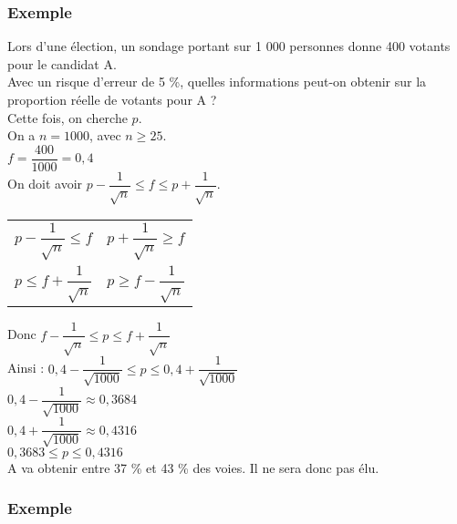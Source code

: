 \newpage 

\subsubsection{Exemple }

Lors d'une élection, un sondage portant sur 1 000 personnes donne 400 votants pour le candidat A. \\ Avec un risque d'erreur de 5  \%, quelles informations peut-on obtenir sur la proportion réelle de votants pour A ? \\

Cette fois, on cherche $p$. \\

On a $n = 1000 $, avec $ n \geq 25 $. \\

$ f = \dfrac{400}{1000} = 0,4 $ \\

On doit avoir $ p - \dfrac{1}{\sqrt{n}} \leq f \leq p + \dfrac{1}{\sqrt{n}} $.

\vspace*{.3cm}

\begin{tabular}{ll}
$ p - \dfrac{1}{\sqrt{n}} \leq f $ & $ p + \dfrac{1}{\sqrt{n}} \geq f $ \\
$ p \leq f + \dfrac{1}{\sqrt{n}}$ & $ p \geq f - \dfrac{1}{\sqrt{n}}$ \\
\end{tabular}

\vspace{.3cm}

Donc $ f - \dfrac{1}{\sqrt{n}} \leq p \leq f + \dfrac{1}{\sqrt{n}} $ \\

Ainsi : $ 0,4 - \dfrac{1}{\sqrt{1000}} \leq p \leq 0,4 + \dfrac{1}{\sqrt{1000}} $ \\

$ 0,4 - \dfrac{1}{\sqrt{1000}} \approx 0,3684 $ \\

$ 0,4 + \dfrac{1}{\sqrt{1000}} \approx 0,4316 $ \\

$ 0,3683 \leq p \leq 0,4316 $ \\

A va obtenir entre 37  \% et 43  \% des voies. Il ne sera donc pas élu.

\newpage 

\subsubsection{Exemple }

